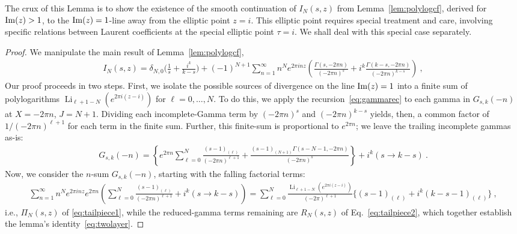 \documentclass[11pt]{article}
\DeclareMathOperator{\Li}{Li}
\begin{document}
The crux of this Lemma is to show the existence of the smooth continuation of $I_N(s, z)$ 
from Lemma~\ref{lem:polylogcf}, derived for ${\rm Im}(z) > 1$, to the ${\rm Im}(z) = 1$-line 
away from the elliptic point $z = i$. This elliptic point requires special treatment and care,
involving specific relations between Laurent coefficients at the special elliptic point $\tau = i$.
We shall deal with this special case separately.

\begin{proof}
We manipulate the main result of Lemma~\ref{lem:polylogcf},
\begin{align}
I_N(s,z)=\delta_{N,0}\Big(\tfrac1s+\tfrac{i^k}{k-s}\Big)+(-1)^{N+1}\sum_{n=1}^{\infty}n^N e^{2\pi inz} \left(
\frac{\Gamma(s,-2\pi n)}{(-2\pi n)^{s}}+i^k\frac{\Gamma(k-s,-2\pi n)}{(-2\pi n)^{k-s}} \right)~,
\end{align}
Our proof proceeds in two steps. First, we isolate the possible sources of divergence on the line ${\rm Im}(z) = 1$ into a finite sum of polylogarithms $\Li_{\ell+1-N}(e^{2 \pi i (z-i)})$ for $\ell = 0, \ldots, N$. To do this, we apply the recursion~\eqref{eq:gammarec} to each gamma in $G_{s,k}(-n)$ at $X=-2\pi n$, $J=N+1$. Dividing each incomplete-Gamma term by $(-2\pi n)^{s}$
and $(-2\pi n)^{k-s}$ yields, then, a common factor of $1/(-2\pi n)^{\ell+1}$ for each term in the finite sum.
Further, this finite-sum is proportional to $e^{2\pi n}$; we leave the trailing incomplete gammas as-is:
\begin{align}
G_{s,k}(-n) =
\left\{
e^{2\pi n}\sum_{\ell = 0}^{N} \frac{(s-1)_{(\ell)}}{(-2\pi n)^{\ell+1}}
{+} \frac{(s{-}1)_{(N{+}1)} \Gamma(s{-}N{-}1,{-}2\pi n)}{(-2\pi n)^s}
\right\} {+}i^k(s{\to}k{-}s)~.
\end{align}
Now, we consider the $n$-sum $G_{s,k}(-n)$, starting with the falling factorial terms:
\begin{align}
\sum_{n=1}^{\infty} n^N e^{2\pi i n z} e^{2 \pi n} \left(  \sum_{\ell = 0}^{N} \frac{(s-1)_{(\ell)}}{(-2\pi n)^{\ell+1}}{+}i^k(s{\to}k{-}s) \right) = \sum_{\ell = 0}^{N} \frac{\Li_{\ell+1-N}(e^{2 \pi i (z -i)})}{(-2\pi)^{\ell+1}} \big\{ (s-1)_{(\ell)} + i^k (k- s-1)_{(\ell)}\big\}~,
\end{align}
i.e., $\Pi_N(s,z)$ of \eqref{eq:tailpiece1}, while the reduced-gamma terms remaining are 
$R_N(s, z)$ of Eq.~\eqref{eq:tailpiece2}, which together establish the lemma's
identity~\eqref{eq:twolayer}.


\end{proof}
\end{document}
